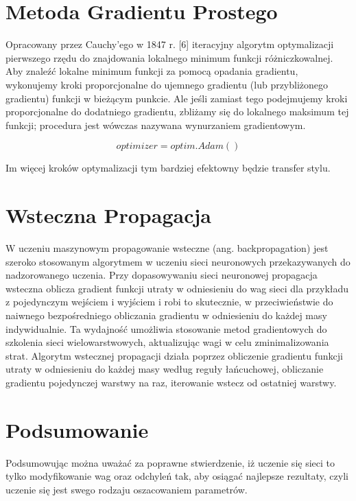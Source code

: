 \documentclass[brudnopis]{xmgr}
\begin{document}
 \section{Metoda Gradientu Prostego\label{s:dsssl}}

Opracowany przez Cauchy'ego w 1847 r. [6] iteracyjny algorytm optymalizacji pierwszego rzędu do znajdowania lokalnego minimum funkcji różniczkowalnej. Aby znaleźć lokalne minimum funkcji za pomocą opadania gradientu, wykonujemy kroki proporcjonalne do ujemnego gradientu (lub przybliżonego gradientu) funkcji w bieżącym punkcie. Ale jeśli zamiast tego podejmujemy kroki proporcjonalne do dodatniego gradientu, zbliżamy się do lokalnego maksimum tej funkcji; procedura jest wówczas nazywana wynurzaniem gradientowym. 


\begin{equation}
optimizer = optim.Adam()
\end{equation}




Im więcej kroków optymalizacji tym bardziej efektowny będzie transfer stylu.


\section{Wsteczna Propagacja\label{s:dsssl}}

W uczeniu maszynowym propagowanie wsteczne (ang. backpropagation) jest szeroko stosowanym algorytmem w uczeniu sieci neuronowych przekazywanych do nadzorowanego uczenia. Przy dopasowywaniu sieci neuronowej propagacja wsteczna oblicza gradient funkcji utraty w odniesieniu do wag sieci dla przykładu z pojedynczym wejściem i wyjściem i robi to skutecznie, w przeciwieństwie do naiwnego bezpośredniego obliczania gradientu w odniesieniu do każdej masy indywidualnie. Ta wydajność umożliwia stosowanie metod gradientowych do szkolenia sieci wielowarstwowych, aktualizując wagi w celu zminimalizowania strat. Algorytm wstecznej propagacji działa poprzez obliczenie gradientu funkcji utraty w odniesieniu do każdej masy według reguły łańcuchowej, obliczanie gradientu pojedynczej warstwy na raz, iterowanie wstecz od ostatniej warstwy.




 \section{Podsumowanie \label{s:dsssl}}
 
Podsumowując można uważać za  poprawne stwierdzenie, iż uczenie się sieci to tylko modyfikowanie wag oraz odchyleń tak, aby osiągać najlepsze rezultaty, czyli uczenie się jest swego rodzaju oszacowaniem parametrów.   
\end{document}
